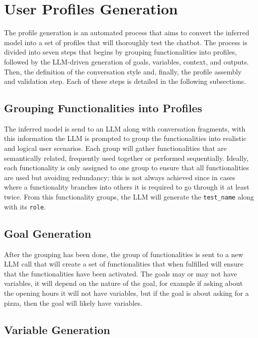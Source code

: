 \section{User Profiles Generation}\label{sec:profile-generation}

The profile generation is an automated process
that aims to convert the inferred model
into a set of profiles that will thoroughly test the chatbot.
The process is divided into seven steps that begins by
grouping functionalities into profiles,
followed by the \ac{LLM}-driven generation of goals, variables, context, and outputs.
Then, the definition of the conversation style and,
finally, the profile assembly and validation step.
Each of these steps is detailed in the following subsections.

\subsection{Grouping Functionalities into Profiles}

The inferred model is send to an \ac{LLM} along with conversation fragments,
with this information the \ac{LLM} is prompted to
group the functionalities into realistic and logical user scenarios.
Each group will gather functionalities that are semantically related,
frequently used together or performed sequentially.
Ideally, each functionality is only assigned to one group
to ensure that all functionalities are used but avoiding redundancy;
this is not always achieved since in cases where a functionality branches into others
it is required to go through it at least twice.
From this functionality groups, the \ac{LLM} will generate
the \texttt{test\_name} along with its \texttt{role}.

\subsection{Goal Generation}

After the grouping has been done,
the group of functionalities is sent to a new \ac{LLM} call
that will create a set of functionalities that when fulfilled
will ensure that the functionalities have been activated.
The goals may or may not have variables,
it will depend on the nature of the goal,
for example if asking about the opening hours it will not have variables,
but if the goal is about asking for a pizza,
then the goal will likely have variables.

\subsection{Variable Generation}

